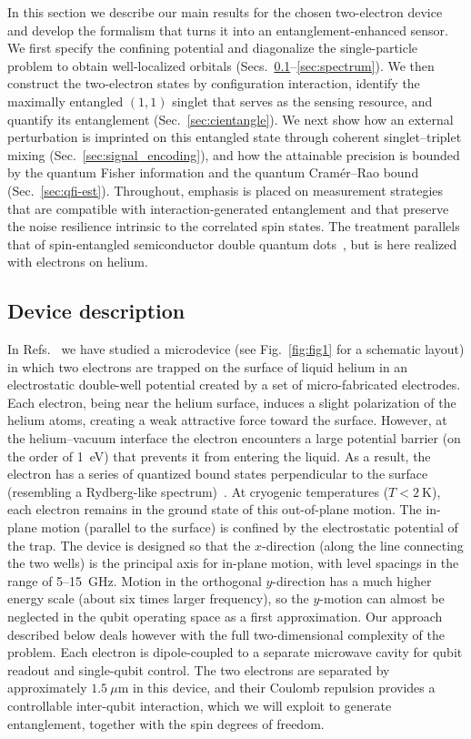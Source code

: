 \documentclass[fleqn,10pt]{wlscirep}
\begin{document}
In this section we describe our main results for the chosen two-electron device and develop the formalism that turns it into an entanglement-enhanced sensor. We first specify the confining potential and diagonalize the single-particle problem to obtain well-localized orbitals (Secs.~\ref{sec:device}--\ref{sec:spectrum}). We then construct the two-electron states by configuration interaction, identify the maximally entangled $(1,1)$ singlet that serves as the sensing resource, and quantify its entanglement (Sec.~\ref{sec:cientangle}). We next show how an external perturbation is imprinted on this entangled state through coherent singlet--triplet mixing (Sec.~\ref{sec:signal_encoding}), and how the attainable precision is bounded by the quantum Fisher information and the quantum Cram\'er--Rao bound (Sec.~\ref{sec:qfi-est}). Throughout, emphasis is placed on measurement strategies that are compatible with interaction-generated entanglement and that preserve the noise resilience intrinsic to the correlated spin states. The treatment parallels that of spin-entangled semiconductor double quantum dots~\cite{degen2017quantum,petta2005coherent,burkard2023semiconductor}, but is here realized with electrons on helium.

\subsection{Device description}
\label{sec:device}

In Refs.~\cite{beysengulov2024,leinonen2025} we have studied a microdevice (see Fig.~\ref{fig:fig1} for a schematic layout) in which two electrons are trapped on the surface of liquid helium in an electrostatic double-well potential created by a set of micro-fabricated electrodes. Each electron, being near the helium surface, induces a slight polarization of the helium atoms, creating a weak attractive force toward the surface. However, at the helium–vacuum interface the electron encounters a large potential barrier (on the order of 1~eV) that prevents it from entering the liquid. As a result, the electron has a series of quantized bound states perpendicular to the surface (resembling a Rydberg-like spectrum)~\cite{monarkha2013two}. At cryogenic temperatures ($T<2~\mathrm{K}$), each electron remains in the ground state of this out-of-plane motion. The in-plane motion (parallel to the surface) is confined by the electrostatic potential of the trap. The device is designed so that the $x$-direction (along the line connecting the two wells) is the principal axis for in-plane motion, with level spacings in the range of 5--15~GHz. Motion in the orthogonal $y$-direction has a much higher energy scale (about six times larger frequency), so the $y$-motion can almost be neglected in the qubit operating space as a first approximation. Our approach described below deals however with the full two-dimensional complexity of the problem. Each electron is dipole-coupled to a separate microwave cavity for qubit readout and single-qubit control. The two electrons are separated by approximately $1.5~\mu\mathrm{m}$ in this device, and their Coulomb repulsion provides a controllable inter-qubit interaction, which we will exploit to generate entanglement, together with the spin degrees of freedom.
\end{document}
